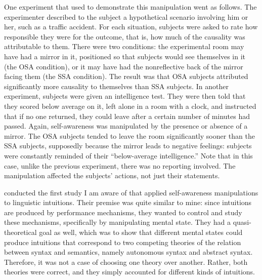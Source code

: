 One experiment that \citeauthor{DuvalEtAl1972} used to demonstrate this manipulation went as follows. The experimenter described to the subject a hypothetical scenario involving him or her, such as a traffic accident. For each situation, subjects were asked to rate how responsible they were for the outcome, that is, how much of the causality was attributable to them. There were two conditions: the experimental room may have had a mirror in it, positioned so that subjects would see themselves in it (the OSA condition), or it may have had the nonreflective back of the mirror facing them (the SSA condition). The result was that OSA subjects attributed significantly more causality to themselves than SSA subjects. In another experiment, subjects were given an intelligence test. They were then told that they scored below average on it, left alone in a room with a clock, and instructed that if no one returned, they could leave after a certain number of minutes had passed. Again, self-awareness was manipulated by the presence or absence of a mirror. The OSA subjects tended to leave the room significantly sooner than the SSA subjects, supposedly because the mirror leads to negative feelings: subjects were constantly reminded of their ``below-average intelligence.'' Note that in this case, unlike the previous experiment, there was no reporting involved. The manipulation affected the subjects' actions, not just their statements.

\citet{CarrollEtAl1981} conducted the first study I am aware of that applied self-awareness manipulations to linguistic intuitions. Their premise was quite similar to mine: since intuitions are produced by performance mechanisms, they wanted to control and study these mechanisms, specifically by manipulating mental state. They had a quasi-theoretical goal as well, which was to show that different mental states could produce intuitions that correspond to two competing theories of the relation between syntax and semantics, namely autonomous syntax and abstract syntax. Therefore, it was not a case of choosing one theory over another. Rather, both theories were correct, and they simply
accounted for different kinds of intuitions. 



